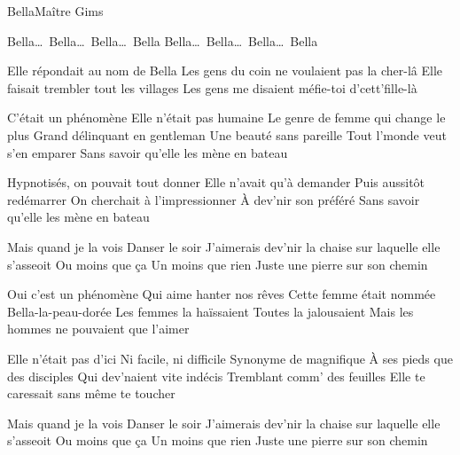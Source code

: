 \documentclass[a4paper,11pt,french]{article}
\begin{document}

\begin{Song}{Bella}{Maître Gims}
\begin{multicols}{2}

\begin{Verse}
Bella\dots\ Bella\dots\ Bella\dots\ Bella
Bella\dots\ Bella\dots\ Bella\dots\ Bella
\end{Verse}
\espaceInterStrophe

\begin{Chorus}
Elle répondait au nom de Bella
Les gens du coin ne voulaient pas la cher-lâ
Elle faisait trembler tout les villages
Les gens me disaient méfie-toi d'cett'fille-là
\bis
\end{Chorus}
\espaceInterStrophe

\begin{Verse}
C'était un phénomène
Elle n'était pas humaine
Le genre de femme qui change le plus
Grand délinquant en gentleman
Une beauté sans pareille
Tout l'monde veut s'en emparer
Sans savoir qu'elle les mène en bateau
\espaceInterStrophe

Hypnotisés, on pouvait tout donner
Elle n'avait qu'à demander
Puis aussitôt redémarrer
On cherchait à l'impressionner
\`A dev'nir son préféré
Sans savoir qu'elle les mène en bateau
\end{Verse}
\espaceInterStrophe

\begin{PreChorus}
Mais quand je la vois
Danser le soir
J'aimerais dev'nir la chaise sur laquelle elle s'asseoit
Ou moins que ça
Un moins que rien
Juste une pierre sur son chemin
\end{PreChorus}
\espaceInterStrophe

\aurefrain
\vfill
\columnbreak

\begin{Verse}
Oui c'est un phénomène
Qui aime hanter nos rêves
Cette femme était nommée
Bella-la-peau-dorée
Les femmes la haïssaient
Toutes la jalousaient
Mais les hommes ne pouvaient que l'aimer
\espaceInterStrophe

Elle n'était pas d'ici
Ni facile, ni difficile
Synonyme de magnifique
\`A ses pieds que des disciples
Qui dev'naient vite indécis
Tremblant comm' des feuilles
Elle te caressait sans même te toucher
\end{Verse}
\espaceInterStrophe

\begin{PreChorus}
Mais quand je la vois
Danser le soir
J'aimerais dev'nir la chaise sur laquelle elle s'asseoit
Ou moins que ça
Un moins que rien
Juste une pierre sur son chemin
\end{PreChorus}
\espaceInterStrophe


\end{multicols}
\end{Song}
\end{document}
